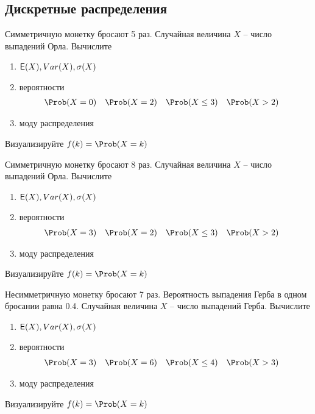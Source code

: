 
\subsection{Дискретные распределения}

\begin{exercise}
Симметричную монетку бросают 5 раз. Случайная величина \(X\) -- число выпадений Орла.
Вычислите
\begin{enumerate}
	\item \({\mathsf E}(X), Var(X), \sigma(X)\)
	\item вероятности
	\begin{align*}
		&\Prob(X=0) & &\Prob(X=2) & &\Prob(X\leq3) & &\Prob(X>2)
	\end{align*}
	\item моду распределения
\end{enumerate}
Визуализируйте \(f(k)=\Prob(X=k)\)
\end{exercise}

\begin{exercise}
Симметричную монетку бросают 8 раз. Случайная величина \(X\) -- число выпадений Орла.
Вычислите
\begin{enumerate}
	\item \({\mathsf E}(X), Var(X), \sigma(X)\)
	\item вероятности
	\begin{align*}
		&\Prob(X=3) & &\Prob(X=2) & &\Prob(X\leq3) & &\Prob(X>2)
	\end{align*}
	\item моду распределения
\end{enumerate}
Визуализируйте \(f(k)=\Prob(X=k)\)
\end{exercise}

\begin{exercise}
Несимметричную монетку бросают 7 раз. Вероятность выпадения Герба в одном бросании равна 0.4. 
Случайная величина \(X\) -- число выпадений Герба. Вычислите
\begin{enumerate}
	\item \({\mathsf E}(X), Var(X), \sigma(X)\)
	\item вероятности
	\begin{align*}
		&\Prob(X=3) & &\Prob(X=6) & &\Prob(X\leq4) & &\Prob(X>3)
	\end{align*}
	\item моду распределения
\end{enumerate}
Визуализируйте \(f(k)=\Prob(X=k)\)
\end{exercise}

